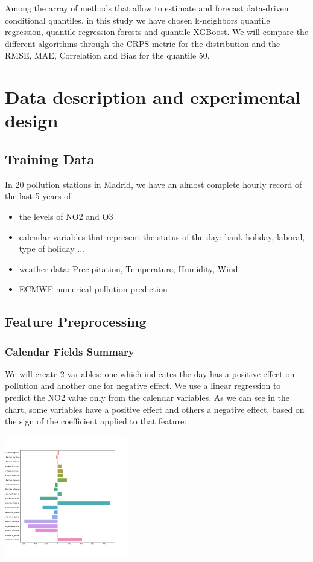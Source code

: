\documentclass[a4paper,twocolumn,5p]{elsarticle}
\begin{document}
Among the array of methods that allow to estimate and forecast
data-driven conditional quantiles, in this study we have chosen
k-neighbors quantile regression, quantile regression forests and quantile XGBoost. 
We will compare the different algorithms through the CRPS metric for the 
distribution and the RMSE, MAE, Correlation and Bias for the quantile 50.

\section{Data description and experimental design}

\subsection{Training Data}

In 20 pollution stations in Madrid, we have an almost complete hourly record of the last 5 years of:
\begin{itemize}
  \item the levels of NO2 and O3
  \item calendar variables that represent the status of the day: bank holiday, laboral, type of holiday ...
  \item weather data: Precipitation, Temperature, Humidity, Wind
  \item ECMWF numerical pollution prediction
\end{itemize} 

\subsection{Feature Preprocessing}

\subsubsection{Calendar Fields Summary}

We will create 2 variables: one which indicates the day has a positive effect on pollution and 
another one for negative effect. We use a linear regression to predict the NO2 value only from the calendar variables.
As we can see in the chart, some variables have a positive effect and others a negative effect, based on the
sign of the coefficient applied to that feature:

\includegraphics[width=0.4\textwidth]{calweights}
\end{document}
